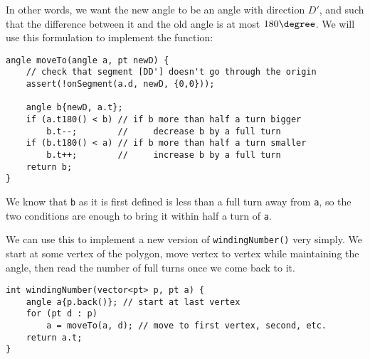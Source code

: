 
In other words, we want the new angle to be an angle with direction $D'$, and such that the difference between it and the old angle is at most $180\degree$. We will use this formulation to implement the function:
\begin{lstlisting}
angle moveTo(angle a, pt newD) {
    // check that segment [DD'] doesn't go through the origin
    assert(!onSegment(a.d, newD, {0,0}));
    
    angle b{newD, a.t};
    if (a.t180() < b) // if b more than half a turn bigger
        b.t--;        //     decrease b by a full turn
    if (b.t180() < a) // if b more than half a turn smaller
        b.t++;        //     increase b by a full turn
    return b;
}
\end{lstlisting}
We know that \lstinline|b| as it is first defined is less than a full turn away from \lstinline|a|, so the two conditions are enough to bring it within half a turn of \lstinline|a|.

We can use this to implement a new version of \lstinline|windingNumber()| very simply. We start at some vertex of the polygon, move vertex to vertex while maintaining the angle, then read the number of full turns once we come back to it.
\begin{lstlisting}
int windingNumber(vector<pt> p, pt a) {
    angle a{p.back()}; // start at last vertex
    for (pt d : p)
        a = moveTo(a, d); // move to first vertex, second, etc.
    return a.t;
}
\end{lstlisting}
